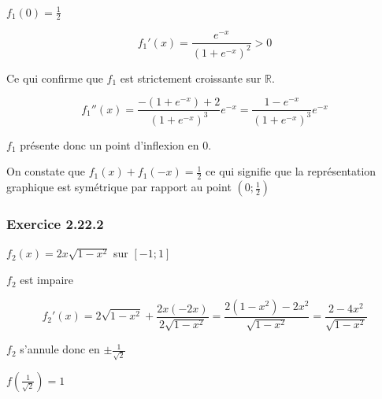 \documentclass{report}
\begin{document}
$f_1(0) = \frac{1}{2}$

\begin{displaymath}
	f_1'(x) = \frac{e^{-x}}{(1+e^{-x})^2} > 0
\end{displaymath}

Ce qui confirme que $f_1$ est strictement croissante sur $\mathbb{R}$.

\begin{displaymath}
	f_1''(x) = \frac{-(1+e^{-x})+2}{(1+e^{-x})^3}e^{-x}
	         = \frac{1-e^{-x}}{(1+e^{-x})^3}e^{-x}
\end{displaymath}

$f_1$ présente donc un point d'inflexion en $0$.

On constate que $f_1(x) + f_1(-x) = \frac{1}{2}$ ce qui signifie que la représentation
graphique est symétrique par rapport au point $(0 ; \frac{1}{2})$





\subsubsection*{Exercice 2.22.2}

$f_2(x) = 2x\sqrt{1-x^2}$ sur $[-1 ; 1]$

$f_2$ est impaire

\begin{displaymath}
	f_2'(x) = 2\sqrt{1-x^2} + \frac{2x(-2x)}{2\sqrt{1-x^2}} 
	        = \frac{2(1-x^2)-2x^2}{\sqrt{1-x^2}}
	        = \frac{2-4x^2}{\sqrt{1-x^2}}
\end{displaymath}

$f_2$ s'annule donc en $\pm \frac{1}{\sqrt{2}}$

$f\left( \frac{1}{\sqrt{2}} \right) = 1$
	
\end{document}
